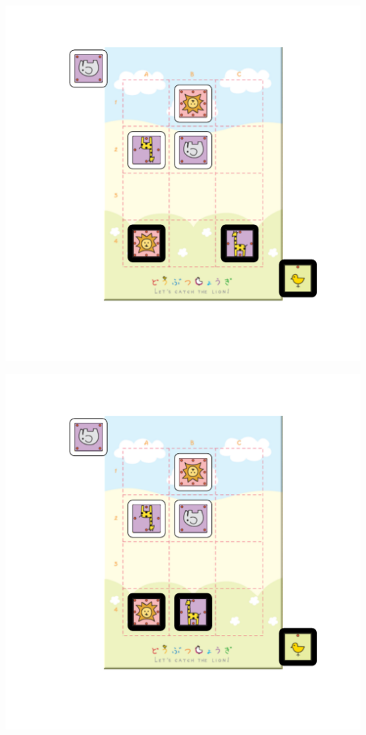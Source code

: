 \documentclass{beamer}
\begin{document}
\begin{frame}
\includegraphics[scale = 0.6, clip=true, trim=1in 1in 0in 0.5in]{example8.pdf}
\end{frame}
\begin{frame}
\includegraphics[scale = 0.6, clip=true, trim=1in 1in 0in 0.5in]{example9.pdf}
\end{frame}
\end{document}
